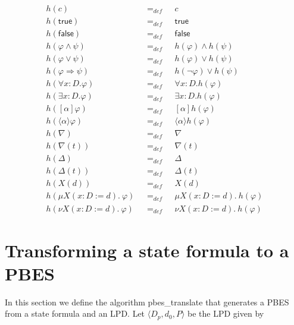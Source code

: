 \documentclass{article}
\begin{document}
\begin{equation*}
\begin{array}{lll}
h(c) & =_{def} & c \\
h(\mathsf{true}) & =_{def} & \mathsf{true} \\
h(\mathsf{false}) & =_{def} & \mathsf{false} \\
h(\varphi \wedge \psi ) & =_{def} & h(\varphi )\wedge h(\psi ) \\
h(\varphi \vee \psi ) & =_{def} & h(\varphi )\vee h(\psi ) \\
h(\varphi \Rightarrow \psi ) & =_{def} & h(\lnot \varphi )\vee h(\psi ) \\
h(\forall {x{:}D}.\varphi ) & =_{def} & \forall {x{:}D}.h(\varphi ) \\
h(\exists {x{:}D}.\varphi ) & =_{def} & \exists {x{:}D}.h(\varphi ) \\
h([\alpha ]\varphi ) & =_{def} & [\alpha ]h(\varphi ) \\
h(\langle \alpha \rangle \varphi ) & =_{def} & \langle \alpha \rangle
h(\varphi ) \\
h(\nabla ) & =_{def} & \nabla  \\
h(\nabla (t)) & =_{def} & \nabla (t) \\
h(\Delta ) & =_{def} & \Delta  \\
h(\Delta (t)) & =_{def} & \Delta (t) \\
h(X(d)) & =_{def} & X(d) \\
h(\mu X(x{:}D:=d).~\varphi )~~~ & =_{def}~~~ & \mu X(x{:}D:=d).~h(\varphi )
\\
h(\nu X(x{:}D:=d).~\varphi )~~~ & =_{def}~~~ & \nu X(x{:}D:=d).~h(\varphi )%
\end{array}%
\end{equation*}

\newpage

\section{Transforming a state formula to a PBES}

In this section we define the algorithm pbes\_translate that generates a
PBES from a state formula and an LPD. Let $\langle {D_p, d_0, P} \rangle $
be the LPD given by
\end{document}
